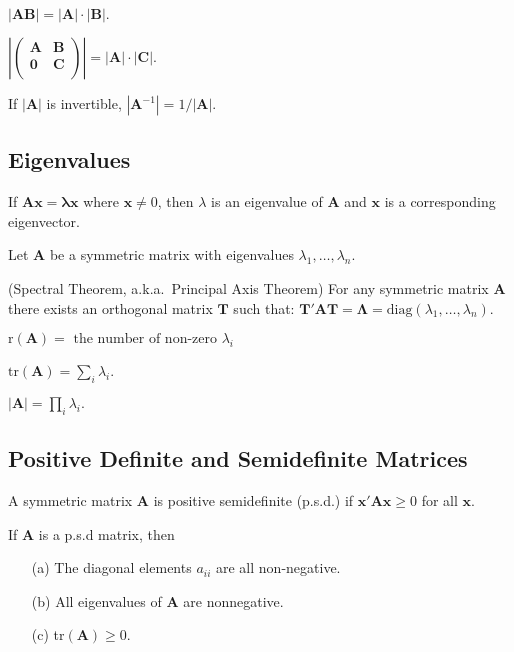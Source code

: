 \bstheo
$ |\mathbf{AB}| = |\mathbf A| \cdot |\mathbf B|.$
\estheo

\bstheo
$\left|\left(\begin{array}{cc} \mathbf{A} & \mathbf{B} \\ \mathbf{0} &
\mathbf{C} \\ \end{array}\right)\right|= |\mathbf A| \cdot |\mathbf
C|.$
\etheo

\bstheo
If $ |\mathbf{A}|$ is invertible, $ |\mathbf{A}^{-1}| = {1}/{ |\mathbf{A}|}$.
\estheo

\newpage
\subsection{Eigenvalues}

\bdefi
If $\mathbf{Ax=\lambda x}$ where $\mathbf x\neq 0$, then $\lambda$ is
an eigenvalue of $\mathbf A$ and $\mathbf x$ is a corresponding
eigenvector.
\edefi

Let $\mathbf A$ be a symmetric matrix with eigenvalues
$\lambda_1,\ldots,\lambda_n$.

\bstheo
(Spectral Theorem, a.k.a.~Principal Axis Theorem)
For any symmetric matrix $\mathbf A$ there exists an orthogonal matrix
$\mathbf T$ such that: $\mathbf{T'AT = \Lambda} = \mathrm{diag}
(\lambda_1,\ldots,\lambda_n)$. 
\estheo

\bstheo
$\mathrm{r}(\mathbf{A})=\mbox{ the number of non-zero } \lambda_i$
\estheo

\bstheo
$\mathrm{tr}(\mathbf{A})=\sum_i \lambda_i$.
\estheo

\bstheo
$|\mathbf{A}|=\prod_i \lambda_i.$
\etheo


\subsection{Positive Definite and Semidefinite Matrices}

\bdefi
A symmetric matrix $\mathbf A$ is positive semidefinite (p.s.d.) if
$\mathbf{x'Ax} \geq 0$ for all $\mathbf x$.
\edefi

\bstheo
If  $\mathbf A$ is a p.s.d matrix, then
\begin{itemize}
\item[(a)] The diagonal elements $a_{ii}$ are all non-negative.
\item[(b)] All eigenvalues of $\mathbf A$ are nonnegative.
\item[(c)] tr$(\mathbf{A})\geq 0$.
\end{itemize}
\estheo

